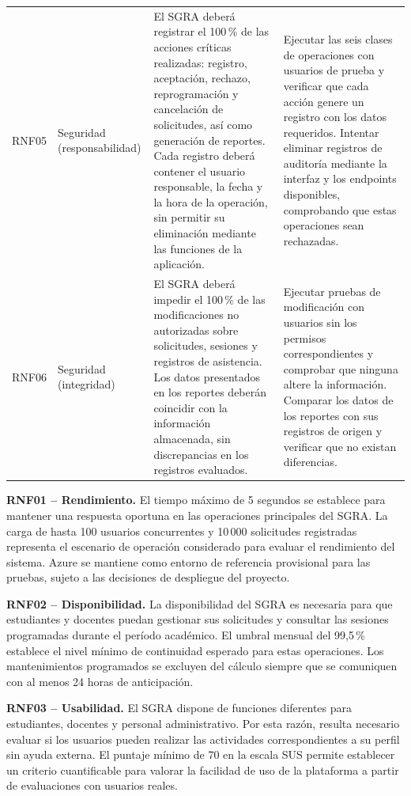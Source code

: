 \begin{longtable}{@{}p{}p{}p{}p{}@{}}
RNF05 &
Seguridad (responsabilidad) &
El SGRA deberá registrar el 100\,\% de las acciones críticas realizadas: registro, aceptación, rechazo, reprogramación y cancelación de solicitudes, así como generación de reportes. Cada registro deberá contener el usuario responsable, la fecha y la hora de la operación, sin permitir su eliminación mediante las funciones de la aplicación. &
Ejecutar las seis clases de operaciones con usuarios de
prueba y verificar que cada acción genere un registro
con los datos requeridos. Intentar eliminar registros
de auditoría mediante la interfaz y los endpoints
disponibles, comprobando que estas operaciones sean
rechazadas. \\

RNF06 &
Seguridad (integridad) &
El SGRA deberá impedir el 100\,\% de las modificaciones no autorizadas sobre solicitudes, sesiones y registros de asistencia. Los datos presentados en los reportes deberán coincidir con la información almacenada, sin discrepancias en los registros evaluados. &
Ejecutar pruebas de modificación con usuarios sin los permisos correspondientes y comprobar que ninguna altere la información. Comparar los datos de los reportes con sus registros de origen y verificar que no existan diferencias. \\

\bottomrule
\end{longtable}

\noindent\textbf{RNF01 -- Rendimiento.}
El tiempo máximo de 5 segundos se establece para mantener una respuesta
oportuna en las operaciones principales del SGRA. La carga de hasta
100 usuarios concurrentes y 10\,000 solicitudes registradas representa
el escenario de operación considerado para evaluar el rendimiento del
sistema. Azure se mantiene como entorno de referencia provisional para
las pruebas, sujeto a las decisiones de despliegue del proyecto.


\par\medskip
\noindent\textbf{RNF02 -- Disponibilidad.}
La disponibilidad del SGRA es necesaria para que estudiantes
y docentes puedan gestionar sus solicitudes y consultar
las sesiones programadas durante el período académico.
El umbral mensual del 99,5\,\% establece el nivel mínimo
de continuidad esperado para estas operaciones. Los
mantenimientos programados se excluyen del cálculo
siempre que se comuniquen con al menos 24 horas
de anticipación.

\par\medskip
\noindent\textbf{RNF03 -- Usabilidad.}
El SGRA dispone de funciones diferentes para estudiantes,
docentes y personal administrativo. Por esta razón, resulta
necesario evaluar si los usuarios pueden realizar las
actividades correspondientes a su perfil sin ayuda externa.
El puntaje mínimo de 70 en la escala SUS permite establecer
un criterio cuantificable para valorar la facilidad de uso
de la plataforma a partir de evaluaciones con usuarios reales.

